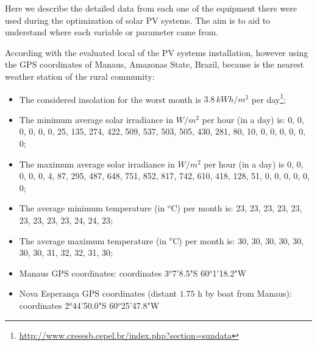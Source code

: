 \documentclass[journal,onecolumn]{IEEEtran}
\begin{document}
% 


\maketitle

Here we describe the detailed data from each one of the equipment there were used during the optimization of solar PV systems. The aim is to aid to understand where each variable or parameter came from.

According with the evaluated local of the PV systems installation, however using the GPS coordinates of Manaus, Amazonas State, Brazil, because is the nearest weather station of the rural community:

\begin{itemize}
 \item The considered insolation for the worst month is $3.8 \, kWh/m^{2}$ per day\footnote{\url{http://www.cresesb.cepel.br/index.php?section=sundata}};
 \item The minimum average solar irradiance in $W/m^{2}$ per hour (in a day) is:  {0, 0, 0, 0, 0, 0, 25, 135, 274, 422, 509, 537, 503, 505, 430, 281, 80, 10, 0, 0, 0, 0, 0, 0};
 \item The maximum average solar irradiance in $W/m^{2}$ per hour (in a day) is {0, 0, 0, 0, 0, 4, 87, 295, 487, 648, 751, 852, 817, 742, 610, 418, 128, 51, 0, 0, 0, 0, 0, 0};
 \item The average minimum temperature (in $^{o}$C) per month is: {23, 23, 23, 23, 23, 23, 23, 23, 23, 24, 24, 23};
 \item The average maximum temperature (in $^{o}$C) per month is: {30, 30, 30, 30, 30, 30, 30, 31, 32, 32, 31, 30};
 \item Manaus GPS coordinates: coordinates 3$^{o}$7'8.5"S 60$^{o}$1'18.2"W
 \item Nova Esperan\c{c}a GPS coordinates (distant $1.75$ h by boat from Manaus): coordinates 2$^{o}$44'50.0"S 60$^{o}$25'47.8"W
\end{itemize} 
\end{document}

